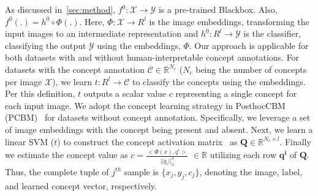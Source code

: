 As discussed in~\cref{sec:method}, $f^0: \mathcal{X} \rightarrow \mathcal{Y}$ is a pre-trained Blackbox. Also, $\displaystyle f^0(.) =  h^0 \circ \Phi(.)$. Here, $ \Phi: \mathcal{X} \rightarrow R^l $ is the image embeddings, transforming the input images to an intermediate representation and $ h^0: R^l \rightarrow \mathcal{Y}$ is the classifier, classifying the output $\mathcal{Y}$ using the embeddings, $\Phi$. Our approach is applicable for both datasets with and without human-interpretable concept annotations. For datasets with the concept annotation $\mathcal{C} \in \mathbb{R}^{N_c}$ ($N_c$ being the number of concepts per image $\mathcal{X}$), we learn $t: R^l \rightarrow\mathcal{C}$ to classify the concepts using the embeddings. Per this definition, $t$ outputs a scalar value $c$ representing a single concept for each input image. 
We adopt the concept learning strategy in PosthocCBM (PCBM)~\cite{yuksekgonul2022post} for datasets without concept annotation. 
Specifically, we leverage a set of image embeddings with the concept being present and absent. Next, we learn a linear SVM ($t$) to construct the concept activation matrix~\cite{kim2017interpretability} as $\boldsymbol{Q} \in\mathbb{R}^{N_c \times l}$. 
Finally we estimate the concept value as $c = \frac{<\Phi(x), q^i>}{||q_i||_2^2}$ $ \in \mathbb{R}$ utilizing each row $\boldsymbol{q^i}$ of $\boldsymbol{Q}$. Thus, the complete tuple of $j^{th}$ sample is $\{x_j, y_j, c_j\}$, denoting the image, label, and learned concept vector, respectively.